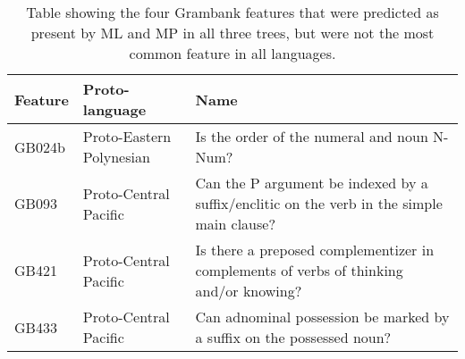 \begin{table}[ht]
\centering
\begin{tabular}{p{2cm}p{4cm}p{8cm}}
  \hline
Feature & Proto-language & Name \\ 
  \hline
GB024b & Proto-Eastern Polynesian & Is the order of the numeral and noun N-Num? \\ 
  GB093 & Proto-Central Pacific & Can the P argument be indexed by a suffix/enclitic on the verb in the simple main clause? \\ 
  GB421 & Proto-Central Pacific & Is there a preposed complementizer in complements of verbs of thinking and/or knowing? \\ 
  GB433 & Proto-Central Pacific & Can adnominal possession be marked by a suffix on the possessed noun? \\ 
   \hline
\end{tabular}
\caption{Table showing the four Grambank features that were predicted as present by ML and MP in all three trees, but were not the most common feature in all languages.} 
\label{table_extra_predictions_four}
\end{table}
